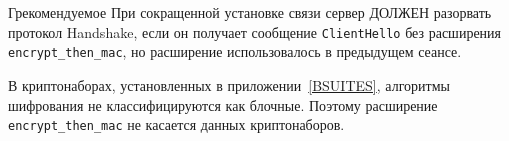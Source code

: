 \begin{appendix}{Г}{рекомендуемое}
При сокращенной установке связи сервер ДОЛЖЕН разорвать протокол Handshake, если
он получает сообщение \lstinline{ClientHello} без расширения
\lstinline{encrypt_then_mac}, но расширение использовалось в предыдущем сеансе.

\begin{note*}
В криптонаборах, установленных в приложении~\ref{BSUITES}, алгоритмы шифрования 
не классифицируются как блочные. Поэтому расширение 
\lstinline{encrypt_then_mac} не касается данных криптонаборов.
\end{note*}

\end{appendix}

\mbox{}
\vfill
\mbox{}
\clearpage

